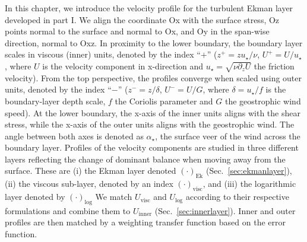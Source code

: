 \documentclass[draft,a4paper,11pt]{article}
\newcommand{\p}{\partial}
\newcommand{\RE}{\mathbf{Re}}
\begin{document}
In this chapter, we introduce the velocity profile for the turbulent Ekman layer developed in part I. 
We align the coordinate Ox with the surface stress, Oz points normal to the surface and normal to Ox, and Oy in the span-wise direction, normal to Oxz.
In proximity to the lower boundary, the boundary layer scales in viscous (inner) units, denoted by the index ``$+$'' ($z^+ = zu_\star/\nu$, $U^+=U/u_\star$, where $U$ is the velocity component in x-direction and $u_\star = \sqrt{\nu \p_z U}$ the friction velocity). From the top perspective, the profiles converge when scaled using outer units, denoted by the index ``$-$'' ($z^-=z/\delta$, $U^-=U/G$, where $\delta=u_\star/f$ is the boundary-layer depth scale, $f$ the Coriolis parameter and $G$ the geostrophic wind speed). 
At the lower boundary, the x-axis of the inner units aligns with the shear stress, while the x-axis of the outer units aligns with the geostrophic wind. The angle between both axes is denoted as $\alpha_\star$, the surface veer of the wind across the boundary layer. 
%
Profiles of the velocity components are studied in three different layers reflecting the change of dominant balance when moving away from the surface. These are
(i) the Ekman layer denoted $(\cdot)_\text{Ek}$ (Sec.~\ref{sec:ekmanlayer}), 
(ii) the viscous sub-layer, denoted by an index $(\cdot)_\text{visc}$, 
and (iii) the logarithmic layer denoted by $(\cdot)_\text{log}$
We match $U_\text{visc}$ and $U_\text{log}$ according to their respective formulations and combine them to $U_\text{inner}$ (Sec.~\ref{sec:innerlayer}).
Inner and outer profiles are then matched by a weighting transfer function based on the error function. 

\end{document}
